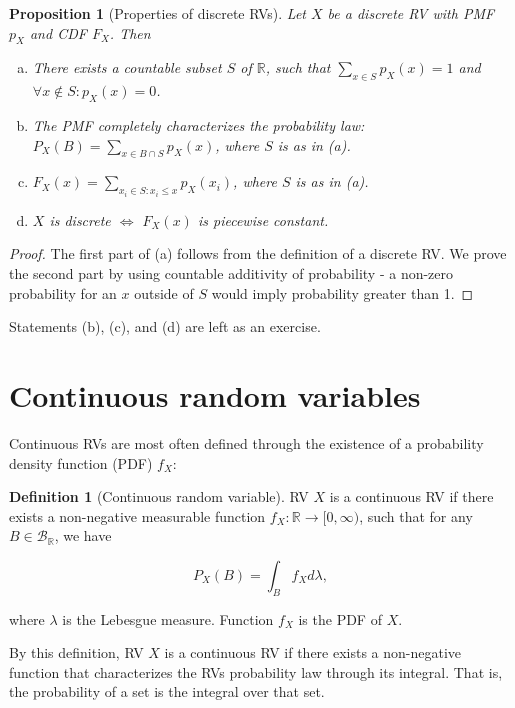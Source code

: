 \documentclass{book}
\theoremstyle{plain}%
\newtheorem{proposition}{Proposition}[section]
\theoremstyle{definition}
\newtheorem{definition}{Definition}[section]
\newlength{\arrow}
\begin{document}
\begin{proposition}[Properties of discrete RVs]

Let $X$ be a discrete RV with PMF $p_X$ and CDF $F_X$. Then

\vspace{0.1pt}
\begin{enumerate}[(a)]
\item There exists a countable subset $S$ of $\mathbb{R}$, such that $\sum_{x \in S} p_X(x) = 1$ and $\forall x \notin S: p_X(x) = 0$.
\item The PMF completely characterizes the probability law: $P_X(B) = \sum_{x \in B \cap S} p_X(x)$, where $S$ is as in \textit{(a)}.
\item $F_X(x) = \sum_{x_i \in S: x_i \leq x} p_X(x_i)$, where $S$ is as in \textit{(a)}.
\item $X$ is discrete $\Longleftrightarrow$ $F_X(x)$ is piecewise constant.
\end{enumerate}\label{prop:pmf}
\end{proposition}

\begin{proof}
The first part of (a) follows from the definition of a discrete RV. We prove the second part by using countable additivity of probability - a non-zero probability for an $x$ outside of $S$ would imply probability greater than 1.
\end{proof}


Statements (b), (c), and (d) are left as an exercise.

\section{Continuous random variables}\label{ch:continuous}

Continuous RVs are most often defined through the existence of a probability density function (PDF) $f_X$:

\begin{definition}[Continuous random variable]
RV $X$ is a continuous RV if there exists a non-negative measurable function $f_X:\mathbb{R} \rightarrow [0, \infty)$, such that for any $B \in \mathcal{B}_\mathbb{R}$, we have 

$$P_X(B) = \int_B f_X d\lambda,$$

where $\lambda$ is the Lebesgue measure. Function $f_X$ is the PDF of $X$.\label{def:rv}
\end{definition}

By this definition, RV $X$ is a continuous RV if there exists a non-negative function that characterizes the RVs probability law through its integral. That is, the probability of a set is the integral over that set.
\end{document}
